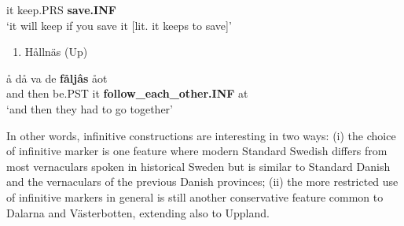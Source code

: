 it  keep.PRS  \textbf{save.INF}\\ %


‘it will keep if you save it [lit. it keeps to save]’
\z


\begin{enumerate} %
\item 
Hållnäs (Up)

\end{enumerate} %
\ea\label{}
\gll å  då  va  de  \textbf{fåljâs} åot\\


and  then  be.PST  it  \textbf{follow\_each\_other.INF} at\\ %


‘and then they had to go together’ 
\z


In other words, infinitive constructions are interesting in two ways: (i) the choice of infinitive marker is one feature where modern Standard Swedish differs from most vernaculars spoken in historical Sweden but is similar to Standard Danish and the vernaculars of the previous Danish provinces; (ii) the more restricted use of infinitive markers in general is still another conservative feature common to Dalarna and Västerbotten, extending also to Uppland. 

